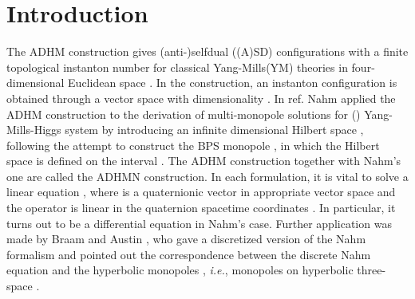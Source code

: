 \documentclass[a4paper,10pt]{article}
\providecommand{\ie}{\textit{i.e.}}
\begin{document}
\section{Introduction}
The ADHM construction \cite{AHDM,DM} gives (anti-)selfdual ((A)SD) configurations with a finite topological instanton number \coordHE{} for classical \coordHE{} Yang-Mills(YM) theories in four-dimensional Euclidean space \coordHE{}.
In the construction, an instanton configuration is obtained through a vector space with dimensionality \coordHE{} \cite{Corri}. 
In ref.\cite{Nahm82} Nahm applied the ADHM construction to the derivation of multi-monopole solutions for \coordHE{} (\coordHE{}) Yang-Mills-Higgs system by introducing an infinite dimensional Hilbert space \coordHE{}, following the attempt\cite{Nahm80} to construct the BPS monopole \cite{Bogo,PS}, in which the Hilbert space is  defined on the interval \coordHE{}.
The ADHM construction together with Nahm's one are called the ADHMN construction.
In each formulation, it is vital to solve a linear equation \coordHE{}, where \coordHE{} is a quaternionic vector in appropriate vector space and the operator \myHighlight{$\Delta$}\coordHE{} is linear in the quaternion spacetime coordinates \coordHE{}.
In particular, it turns out to be a differential equation  in Nahm's case.
Further application was made by Braam and Austin \cite{BA}, who gave a discretized version of the Nahm formalism and pointed out the correspondence between the discrete Nahm equation and the hyperbolic monopoles \cite{Ati}, \ie, monopoles on hyperbolic three-space \coordHE{}.
\end{document}
